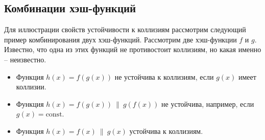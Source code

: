 \subsection{Комбинации хэш-функций}

Для иллюстрации свойств устойчивости к коллизиям рассмотрим следующий пример комбинирования двух хэш-функций. Рассмотрим две хэш-функции $f$ и $g$. Известно, что одна из этих функций не противостоит коллизиям, но какая именно -- неизвестно.
\begin{itemize}
    \item Функция $h(x) = f(g(x))$ не устойчива к коллизиям, если $g(x)$ имеет коллизии.
    \item Функция $h(x) = f(g(x)) ~\|~ g(f(x))$ не устойчива, например, если $g(x) = \textrm{const}$.
    \item Функция $h(x) = f(x) ~\|~ g(x)$ устойчива к коллизиям.
\end{itemize}
